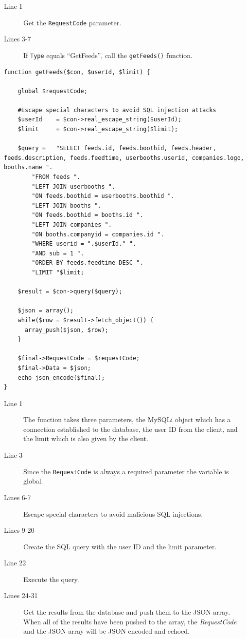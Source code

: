 \begin{description}
\item[Line 1] Get the \lstinline|RequestCode| parameter.
\item[Lines 3-7] If \lstinline|Type| equals ``GetFeeds'', call the \lstinline|getFeeds()| function.
\end{description}

\begin{lstlisting}[language=phpstyle, label=lst:getFeeds, caption={getFeeds function}]
function getFeeds($con, $userId, $limit) {

    global $requestCode;

    #Escape special characters to avoid SQL injection attacks
    $userId    = $con->real_escape_string($userId);
    $limit     = $con->real_escape_string($limit);

    $query =   "SELECT feeds.id, feeds.boothid, feeds.header, feeds.description, feeds.feedtime, userbooths.userid, companies.logo, booths.name ".
        "FROM feeds ".
        "LEFT JOIN userbooths ".
        "ON feeds.boothid = userbooths.boothid ".
        "LEFT JOIN booths ".
        "ON feeds.boothid = booths.id ".
        "LEFT JOIN companies ".
        "ON booths.companyid = companies.id ".
        "WHERE userid = ".$userId." ".
        "AND sub = 1 ".
        "ORDER BY feeds.feedtime DESC ".
        "LIMIT "$limit;

    $result = $con->query($query);

    $json = array();
    while($row = $result->fetch_object()) {
      array_push($json, $row);
    }
    
    $final->RequestCode = $requestCode;
    $final->Data = $json;
    echo json_encode($final);
}
\end{lstlisting}

\begin{description}
\item[Line 1] The function takes three parameters, the MySQLi object which has a connection
  established to the database, the user ID from the client, and the limit which is also given by the client.
\item[Line 3] Since the \lstinline|RequestCode| is always a required parameter the variable is global.
\item[Lines 6-7] Escape special characters to avoid malicious SQL injections.
\item[Lines 9-20] Create the SQL query with the user ID and the limit parameter.
\item[Line 22] Execute the query.
\item[Lines 24-31] Get the results from the database and push them to the JSON array. When all of the results have been pushed to the array, the \textit{RequestCode} and the JSON array will be JSON encoded and echoed.
\end{description}

